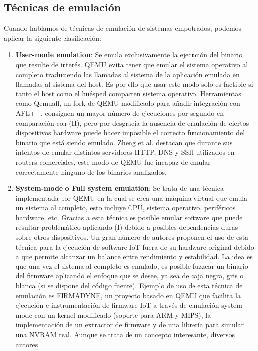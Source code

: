\subsection{Técnicas de emulación}
Cuando hablamos de técnicas de emulación de sistemas empotrados, podemos aplicar la siguiente clasificación:
\begin{enumerate}[I]
    \item \textbf{User-mode emulation}: Se emula exclusivamente la ejecución del binario que resulte de interés. QEMU evita tener que emular el sistema 
    operativo al completo traduciendo las llamadas al sistema de la aplicación emulada en llamadas al sistema del host. Es por ello que usar este modo 
    solo es factible si tanto el host como el huésped comparten sistema operativo. Herramientas como Qemuafl\cite{qemuafl}, un fork de QEMU modificado para añadir 
    integración con AFL++, consiguen un mayor número de 
    ejecuciones por segundo en comparación con (II), pero por desgracia la ausencia de emulación de ciertos dispositivos hardware puede hacer imposible 
    el correcto funcionamiento del binario que está siendo emulado. Zheng et al.\cite{Zheng2019} destacan que durante sus intentos de emular distintos 
    servidores HTTP, DNS y SSH utilizados en routers comerciales, este modo de QEMU fue incapaz de emular correctamente ninguno de los binarios analizados.
    \item \textbf{System-mode o Full system emulation}: Se trata de una técnica implementada por QEMU en la cual se crea una máquina virtual que emula un 
    sistema al completo, esto incluye CPU, sistema operativo, periféricos hardware, etc. Gracias a esta técnica es posible emular software que puede resultar 
    problemático aplicando (I) debido a posibles dependencias duras sobre otros dispositivos. Un gran número de autores proponen el uso de esta técnica 
    para la ejecución de software IoT fuera de su hardware original debido a que permite alcanzar un balance entre rendimiento y estabilidad. La idea es que 
    una vez el sistema al completo es emulado, es posible fuzzear un binario del firmware aplicando el enfoque que se desee, ya sea de caja negra, gris o 
    blanca (si se dispone del código fuente). Ejemplo de uso de esta técnica de emulación es FIRMADYNE\cite{Chen2016}, un proyecto basado en QEMU\cite{qemu}
    que facilita la ejecución e instrumentación de firmware IoT a través de emulación system-mode con un kernel modificado (soporte para ARM y MIPS), la 
    implementación de un extractor de firmware y de una librería para simular una NVRAM real. Aunque se trata de un concepto interesante, diversos autores 

\end{enumerate}
